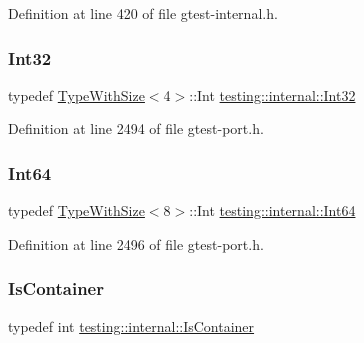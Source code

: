 Definition at line 420 of file gtest-\/internal.\+h.

\mbox{\label{namespacetesting_1_1internal_a8ee38faaf875f133358abaf9bc056cec}} 
\subsubsection{\texorpdfstring{Int32}{Int32}}
{\footnotesize\ttfamily typedef \hyperlink{classtesting_1_1internal_1_1TypeWithSize}{Type\+With\+Size}$<$4$>$\+::Int \hyperlink{namespacetesting_1_1internal_a8ee38faaf875f133358abaf9bc056cec}{testing\+::internal\+::\+Int32}}



Definition at line 2494 of file gtest-\/port.\+h.

\mbox{\label{namespacetesting_1_1internal_a271c563fec38b804ddab0677f51f70a8}} 
\subsubsection{\texorpdfstring{Int64}{Int64}}
{\footnotesize\ttfamily typedef \hyperlink{classtesting_1_1internal_1_1TypeWithSize}{Type\+With\+Size}$<$8$>$\+::Int \hyperlink{namespacetesting_1_1internal_a271c563fec38b804ddab0677f51f70a8}{testing\+::internal\+::\+Int64}}



Definition at line 2496 of file gtest-\/port.\+h.

\mbox{\label{namespacetesting_1_1internal_ad8f0c2883245f1df2a53618a49f0deb3}} 
\subsubsection{\texorpdfstring{Is\+Container}{IsContainer}}
{\footnotesize\ttfamily typedef int \hyperlink{namespacetesting_1_1internal_ad8f0c2883245f1df2a53618a49f0deb3}{testing\+::internal\+::\+Is\+Container}}



